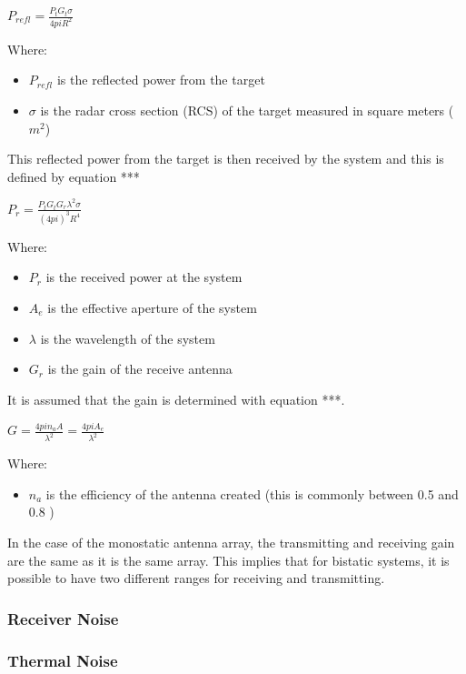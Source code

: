 \documentclass[11pt]{witseiepaper}
\begin{document}
$P_{refl} = \frac{P_{t} G_{t} \sigma}{4 pi R^2}$

Where:
\begin{itemize}
    \item $P_{refl}$ is the reflected power from the target
    \item $\sigma$ is the radar cross section (RCS) of the target measured in square meters ($m^2$)
\end{itemize}

This reflected power from the target is then received by the system and this is defined by equation ***

$P_{r} = \frac{P_{t} G_{t} G_{r} \lambda^2 \sigma}{(4 pi )^3 R^4}$

Where:
\begin{itemize}
    \item $P_{r}$ is the received power at the system
    \item $A_{e}$ is the effective aperture of the system
    \item $\lambda$ is the wavelength of the system
    \item $G_{r}$ is the gain of the receive antenna
\end{itemize}

It is assumed that the gain is determined with equation ***.

$G = \frac{4 pi n_{a} A}{\lambda^2} = \frac{4 pi A_{e}}{\lambda^2}$

Where:
\begin{itemize}
    \item $n_{a}$ is the efficiency of the antenna created (this is commonly between 0.5 and 0.8 \cite[p.~64]{radarHandbook})
\end{itemize}

In the case of the monostatic antenna array, the transmitting and receiving gain are the same as it is the same array. This implies that for bistatic systems, it is possible to have two different ranges for receiving and transmitting.


\subsubsection{Receiver Noise} \label{sec:ReceiverNoise}

\subsubsection{Thermal Noise} \label{sec:ThermalNoise}
\end{document}

